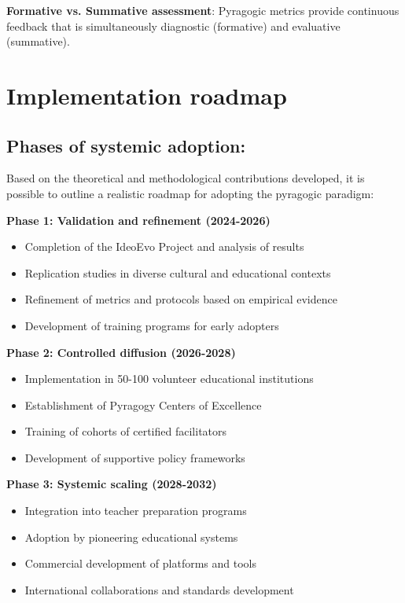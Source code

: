 \textbf{Formative vs. Summative assessment}: Pyragogic metrics provide continuous feedback that is simultaneously diagnostic (formative) and evaluative (summative).

\section{Implementation roadmap}
\subsection*{Phases of systemic adoption:}

Based on the theoretical and methodological contributions developed, it is possible to outline a realistic roadmap for adopting the pyragogic paradigm:

\textbf{Phase 1: Validation and refinement (2024-2026)}
\begin{itemize}
	\item Completion of the IdeoEvo Project and analysis of results
	\item Replication studies in diverse cultural and educational contexts
	\item Refinement of metrics and protocols based on empirical evidence
	\item Development of training programs for early adopters
\end{itemize}

\textbf{Phase 2: Controlled diffusion (2026-2028)}
\begin{itemize}
	\item Implementation in 50-100 volunteer educational institutions
	\item Establishment of Pyragogy Centers of Excellence
	\item Training of cohorts of certified facilitators
	\item Development of supportive policy frameworks
\end{itemize}

\textbf{Phase 3: Systemic scaling (2028-2032)}
\begin{itemize}
	\item Integration into teacher preparation programs
	\item Adoption by pioneering educational systems
	\item Commercial development of platforms and tools
	\item International collaborations and standards development
\end{itemize}

